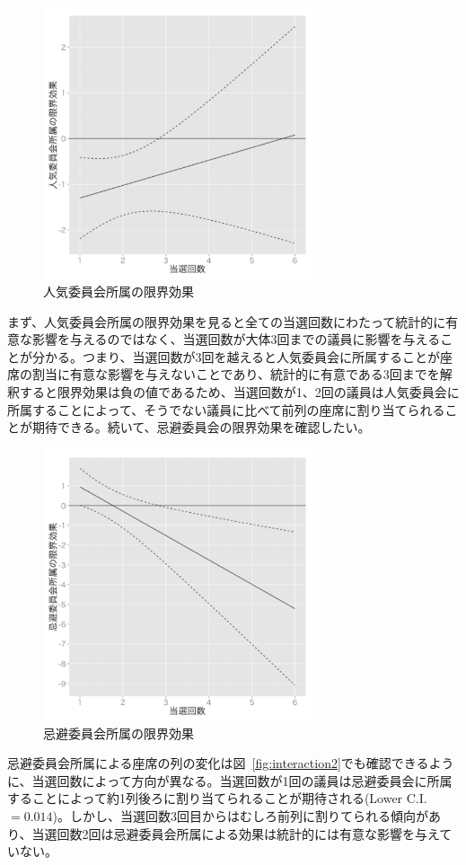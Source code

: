 \documentclass[12pt, a4j]{jsarticle}
\begin{document}
\begin{figure}[htbp]
	\centering
		\includegraphics[width=8cm]{0_figs/meplot1.pdf}
		\caption{人気委員会所属の限界効果} \label{fig:me1}
\end{figure}

まず、人気委員会所属の限界効果を見ると全ての当選回数にわたって統計的に有意な影響を与えるのではなく、当選回数が大体3回までの議員に影響を与えることが分かる。つまり、当選回数が3回を越えると人気委員会に所属することが座席の割当に有意な影響を与えないことであり、統計的に有意である3回までを解釈すると限界効果は負の値であるため、当選回数が1、2回の議員は人気委員会に所属することによって、そうでない議員に比べて前列の座席に割り当てられることが期待できる。続いて、忌避委員会の限界効果を確認したい。\par

\begin{figure}[htbp]
	\centering
		\includegraphics[width=8cm]{0_figs/meplot2.pdf}
		\caption{忌避委員会所属の限界効果} \label{fig:me2}
\end{figure}

忌避委員会所属による座席の列の変化は図~\ref{fig:interaction2}でも確認できるように、当選回数によって方向が異なる。当選回数が1回の議員は忌避委員会に所属することによって約1列後ろに割り当てられることが期待される(Lower C.I. $= 0.014$)。しかし、当選回数3回目からはむしろ前列に割りてられる傾向があり、当選回数2回は忌避委員会所属による効果は統計的には有意な影響を与えていない。\par
\end{document}
